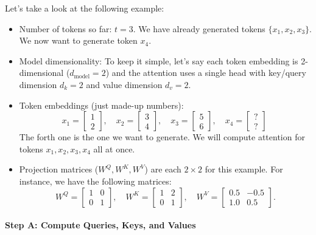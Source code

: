 Let's take a look at the following example:
\begin{itemize}
	\item Number of tokens so far: \(t=3\). We have already generated tokens \(\{x_1, x_2, x_3\}\). We now want to generate token \(x_4\).  
	\item Model dimensionality: To keep it simple, let's say each token embedding is 2-dimensional (\(d_{\text{model}} = 2\)) and the attention uses a single head with key/query dimension \(d_k = 2\) and value dimension \(d_v = 2\). 
	\item Token embeddings (just made-up numbers):
	  \[
		x_1 = \begin{bmatrix}1 \\ 2\end{bmatrix}, \quad
		x_2 = \begin{bmatrix}3 \\ 4\end{bmatrix}, \quad
		x_3 = \begin{bmatrix}5 \\ 6\end{bmatrix}, \quad
		x_4 = \begin{bmatrix}? \\ ?\end{bmatrix} \; 
	  \]
	  The forth one is the one we want to generate. We will compute attention for tokens \(x_1, x_2, x_3, x_4\) all at once.  
  \item Projection matrices (\(W^Q, W^K, W^V\)) are each \(2 \times 2\) for this example. For instance, we have the following matrices:
  \[
    W^Q = \begin{bmatrix}1 & 0 \\[6pt] 0 & 1\end{bmatrix}, \quad
    W^K = \begin{bmatrix}1 & 2 \\[6pt] 0 & 1\end{bmatrix}, \quad
    W^V = \begin{bmatrix}0.5 & -0.5 \\[6pt] 1.0 & 0.5\end{bmatrix}.
  \]
\end{itemize}

\paragraph{Step A: Compute Queries, Keys, and Values}

